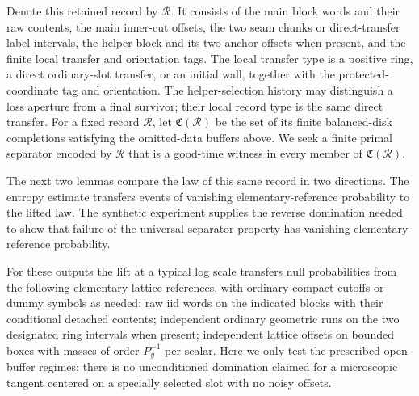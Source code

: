 Denote this retained record by $\mathcal R$. It consists of the main
block words and their raw contents, the main inner-cut offsets, the two
seam chunks or direct-transfer label intervals, the helper block and its
two anchor offsets when present, and the finite local transfer and orientation tags. The local transfer
type is a positive ring, a direct ordinary-slot transfer, or an initial
wall, together with the protected-coordinate tag and orientation. The helper-selection
history may distinguish a loss aperture from a final survivor; their local
record type is the same direct transfer.
For a fixed record $\mathcal R$, let $\mathfrak C(\mathcal R)$ be the set
of its finite balanced-disk completions satisfying the omitted-data buffers
above. We seek a finite primal separator encoded by $\mathcal R$ that is
a good-time witness in every member of $\mathfrak C(\mathcal R)$.

The next two lemmas compare the law of this same record in two directions.
The entropy estimate transfers events of vanishing elementary-reference
probability to the lifted law. The synthetic experiment supplies the reverse
domination needed to show that failure of the universal separator property
has vanishing elementary-reference probability.

\begin{lemma}\label{end:record-null-transfer}

For these outputs the lift at a typical log scale transfers null probabilities from the
following elementary lattice references, with ordinary compact cutoffs or dummy symbols as
needed: raw iid words on the indicated blocks with their conditional detached contents;
independent ordinary geometric runs on the two designated ring intervals when present;
independent lattice offsets on bounded boxes with masses of order \(P_y^{-1}\) per scalar.
Here we only test the prescribed open-buffer regimes; there is no unconditioned domination
claimed for a microscopic tangent centered on a specially selected slot with no noisy
offsets.

\end{lemma}

